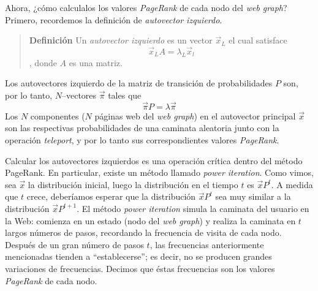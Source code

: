 			Ahora, ¿cómo calculalos los valores \textit{PageRank} de cada nodo del \textit{web graph}? Primero, recordemos la definición de \textit{autovector izquierdo}.
			\begin{quote}
				\textbf{Definición} Un \textit{autovector izquierdo} es un vector $\vec{x}_L$ el cual satisface 
					\begin{equation}
						\vec{x}_LA = \lambda_L\vec{x}_l
					\end{equation}
				, donde $A$ es una matriz.
			\end{quote}
			Los autovectores izquierdo de la matriz de transición de probabilidades $P$ son, por lo tanto, $N$--vectores $\vec{\pi}$ tales que
			\begin{equation}
				\vec{\pi}P = \lambda \vec{\pi}
			\end{equation}
			Los $N$ componentes ($N$ páginas web del \textit{web graph}) en el autovector principal $\vec{x}$ son las respectivas probabilidades de una caminata aleatoria junto con la operación \textit{teleport}, y por lo tanto sus correspondientes valores \textit{PageRank}. \par
			
			Calcular los autovectores izquierdos es una operación crítica dentro del método PageRank. En particular, existe un método llamado \textit{power iteration}. Como vimos, sea $\vec{x}$ la distribución inicial, luego la distribución en el tiempo $t$ es $\vec{x}P^{t}$. A medida que $t$ crece, deberíamos esperar que la distribución $\vec{x}P^{t}$ sea muy similar a la distribución $\vec{x}P^{t + 1}$. El método \textit{power iteration} simula la caminata del usuario en la Web: comienza en un estado (nodo del \textit{web graph}) y realiza la caminata en $t$ largos números de pasos, recordando la frecuencia de visita de cada nodo. Después de un gran número de pasos $t$, las frecuencias anteriormente mencionadas tienden a \enquote{establecerse}; es decir, no se producen grandes variaciones de frecuencias. Decimos que éstas frecuencias son los valores \textit{PageRank} de cada nodo.
			
